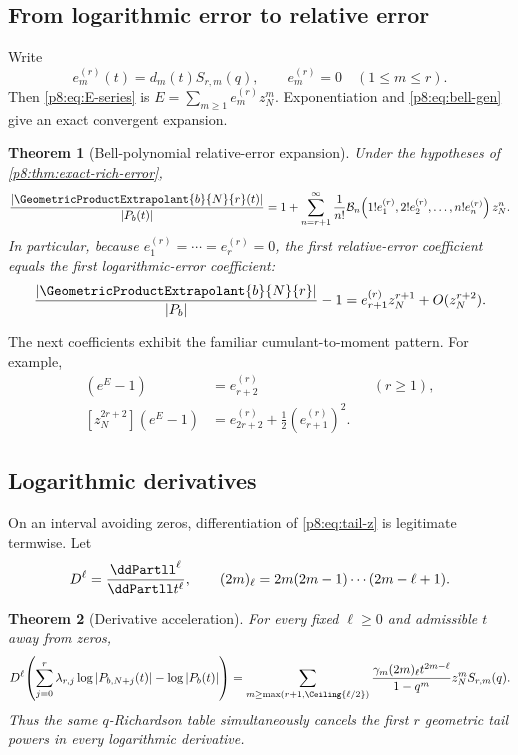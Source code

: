 \documentclass[11pt]{article}
\numberwithin{equation}{section}
\newtheorem{theorem}{Theorem}[section]
\theoremstyle{definition}
\theoremstyle{remark}
\begin{document}
\subsection{From logarithmic error to relative error}

Write
\begin{equation}
e_m^{(r)}(t)=d_m(t)S_{r,m}(q),
\qquad e_m^{(r)}=0\quad(1\le m\le r).
\label{p8:eq:em}
\end{equation}
Then \cref{p8:eq:E-series} is $E=\sum_{m\ge1}e_m^{(r)}z_N^m$. Exponentiation and \cref{p8:eq:bell-gen} give an exact convergent expansion.

\begin{theorem}[Bell-polynomial relative-error expansion]
\label{p8:thm:bell-relative}
Under the hypotheses of \cref{p8:thm:exact-rich-error},
\begin{equation}
\frac{|\GeometricProductExtrapolant{b}{N}{r}(t)|}{|P_b(t)|}
=1+\sum_{n=r+1}^{\infty}
\frac{1}{n!}
\mathcal B_n\!\left(1!e_1^{(r)},2!e_2^{(r)},\ldots,n!e_n^{(r)}\right)z_N^n.
\label{p8:eq:bell-relative}
\end{equation}
In particular, because $e_1^{(r)}=\cdots=e_r^{(r)}=0$, the first relative-error coefficient equals the first logarithmic-error coefficient:
\begin{equation}
\frac{|\GeometricProductExtrapolant{b}{N}{r}|}{|P_b|}-1
=e_{r+1}^{(r)}z_N^{r+1}+O(z_N^{r+2}).
\label{p8:eq:first-relative}
\end{equation}
\end{theorem}

The next coefficients exhibit the familiar cumulant-to-moment pattern. For example,
\begin{align*}
[z_N^{r+2}]\left(e^E-1\right)&=e_{r+2}^{(r)}
&& (r\ge1),\\
[z_N^{2r+2}]\left(e^E-1\right)&=e_{2r+2}^{(r)}+\frac12(e_{r+1}^{(r)})^2.
\end{align*}

\subsection{Logarithmic derivatives}

On an interval avoiding zeros, differentiation of \cref{p8:eq:tail-z} is legitimate termwise. Let
\[
D^\ell=\frac{\ddPartll^\ell}{\ddPartll t^\ell},\qquad
(2m)_{\ell}=2m(2m-1)\cdots(2m-\ell+1).
\]

\begin{theorem}[Derivative acceleration]
\label{p8:thm:derivative-accel}
For every fixed $\ell\ge0$ and admissible $t$ away from zeros,
\begin{equation}
D^\ell\!\left(
\sum_{j=0}^{r}\lambda_{r,j}\log|P_{b,N+j}(t)|
-\log|P_b(t)|\right)
=
\sum_{m\ge\max(r+1,\Ceiling{\ell/2})}
\frac{\gamma_m(2m)_\ell t^{2m-\ell}}
{1-q^m}z_N^mS_{r,m}(q).
\label{p8:eq:derivative-error}
\end{equation}
Thus the same $q$-Richardson table simultaneously cancels the first $r$ geometric tail powers in every logarithmic derivative.
\end{theorem}
\end{document}
